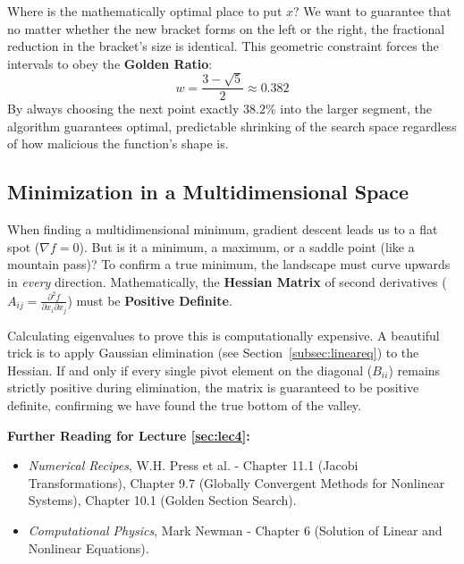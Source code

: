 \documentclass[12pt, a4paper]{article}
\begin{document}
Where is the mathematically optimal place to put $x$? We want to guarantee that no matter whether the new bracket forms on the left or the right, the fractional reduction in the bracket's size is identical.
This geometric constraint forces the intervals to obey the \textbf{Golden Ratio}:
\begin{equation}
w = \frac{3 - \sqrt{5}}{2} \approx 0.382
\end{equation}
By always choosing the next point exactly $38.2\%$ into the larger segment, the algorithm guarantees optimal, predictable shrinking of the search space regardless of how malicious the function's shape is.

\subsection{Minimization in a Multidimensional Space}
\label{subsec:multimin}
When finding a multidimensional minimum, gradient descent leads us to a flat spot ($\nabla f = 0$). But is it a minimum, a maximum, or a saddle point (like a mountain pass)?
To confirm a true minimum, the landscape must curve upwards in \textit{every} direction. Mathematically, the \textbf{Hessian Matrix} of second derivatives ($A_{ij} = \frac{\partial^2 f}{\partial x_i \partial x_j}$) must be \textbf{Positive Definite}.

Calculating eigenvalues to prove this is computationally expensive. A beautiful trick is to apply Gaussian elimination (see Section~\ref{subsec:lineareq}) to the Hessian. If and only if every single pivot element on the diagonal ($B_{ii}$) remains strictly positive during elimination, the matrix is guaranteed to be positive definite, confirming we have found the true bottom of the valley.

\vspace{0.5cm}
\noindent \textbf{Further Reading for Lecture \ref{sec:lec4}:}
\begin{itemize}
    \item \textit{Numerical Recipes}, W.H. Press et al. - Chapter 11.1 (Jacobi Transformations), Chapter 9.7 (Globally Convergent Methods for Nonlinear Systems), Chapter 10.1 (Golden Section Search).
    \item \textit{Computational Physics}, Mark Newman - Chapter 6 (Solution of Linear and Nonlinear Equations).
\end{itemize}
\end{document}
